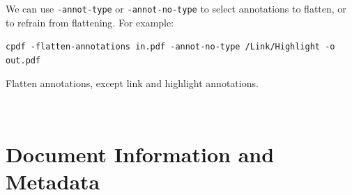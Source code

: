 \documentclass{book}
\begin{document}
\noindent We can use \texttt{-annot-type} or \texttt{-annot-no-type} to select annotations to flatten, or to refrain from flattening. For example:

  \begin{framed}
    \noindent\small\verb!cpdf -flatten-annotations in.pdf -annot-no-type /Link/Highlight -o out.pdf!
    
    \vspace{2.5mm}
    \noindent Flatten annotations, except link and highlight annotations.
  \end{framed}
\ \ \ 

\pagestyle{empty}\thispagestyle{fancy}

\chapter{Document Information and Metadata}\label{chap:11}
\pagestyle{fancy}
\end{document}
